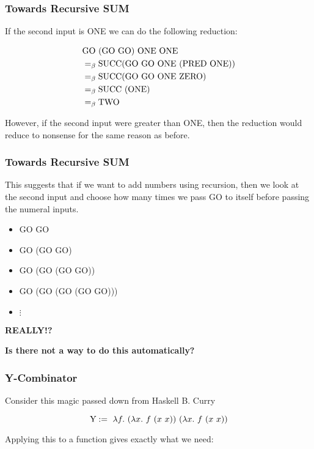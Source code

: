 \documentclass{beamer}
\begin{document}
\begin{frame}
	\frametitle{Towards Recursive SUM}

	If the second input is ONE we can do the following reduction:

	\begin{align*}
		&\text{GO} \ (\text{GO} \ \text{GO}) \ \text{ONE} \ \text{ONE} \\
		&=_{\beta} \text{SUCC} (\text{GO} \ \text{GO} \ \text{ONE} \ (\text{PRED} \ \text{ONE})) \\
		&=_{\beta} \text{SUCC} (\text{GO} \ \text{GO} \ \text{ONE} \ \text{ZERO}) \\
		&=_{\beta} \text{SUCC} \ (\text{ONE}) \\
		&=_{\beta} \text{TWO}
	\end{align*}

	However, if the second input were greater than ONE, then the reduction would reduce to nonsense for the same reason as before.
\end{frame}

\begin{frame}
	\frametitle{Towards Recursive SUM}

	This suggests that if we want to add numbers using recursion, then we look at the second input and choose how many times we pass GO to itself before passing the numeral inputs. 

	\begin{itemize}
		\item[] GO GO
		\item[] GO (GO GO)
		\item[] GO (GO (GO GO))
		\item[] GO (GO (GO (GO GO)))
		\item[] $\vdots$
	\end{itemize}

	{\bf REALLY!?}

	{\bf Is there not a way to do this automatically?}

\end{frame}

\begin{frame}
	\frametitle{Y-Combinator}

	Consider this magic passed down from Haskell B. Curry

	$$\text{Y}:= \ \lambda f. \ (\lambda x. \ f \ (x \ x)) \ (\lambda x. \ f \ (x \ x))$$

	Applying this to a function gives exactly what we need:

	\vspace{4cm}

\end{frame}
\end{document}
